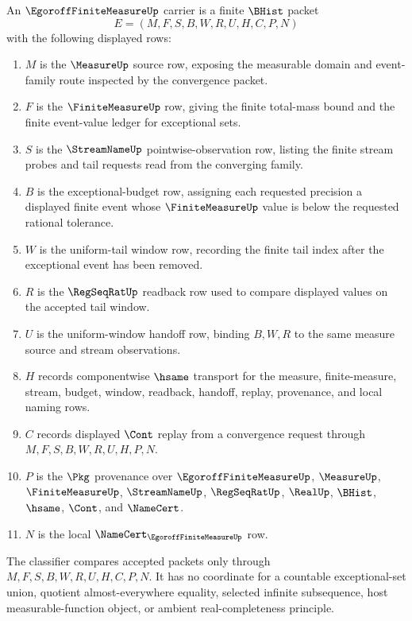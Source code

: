\begin{definition}
\label{def:egoroff-finite-measure-carrier}
An $\EgoroffFiniteMeasureUp$ carrier is a finite $\BHist$ packet
$$
E=(M,F,S,B,W,R,U,H,C,P,N)
$$
with the following displayed rows:
\begin{enumerate}
\item $M$ is the $\MeasureUp$ source row, exposing the measurable domain and event-family route inspected by the convergence packet.
\item $F$ is the $\FiniteMeasureUp$ row, giving the finite total-mass bound and the finite event-value ledger for exceptional sets.
\item $S$ is the $\StreamNameUp$ pointwise-observation row, listing the finite stream probes and tail requests read from the converging family.
\item $B$ is the exceptional-budget row, assigning each requested precision a displayed finite event whose $\FiniteMeasureUp$ value is below the requested rational tolerance.
\item $W$ is the uniform-tail window row, recording the finite tail index after the exceptional event has been removed.
\item $R$ is the $\RegSeqRatUp$ readback row used to compare displayed values on the accepted tail window.
\item $U$ is the uniform-window handoff row, binding $B,W,R$ to the same measure source and stream observations.
\item $H$ records componentwise $\hsame$ transport for the measure, finite-measure, stream, budget, window, readback, handoff, replay, provenance, and local naming rows.
\item $C$ records displayed $\Cont$ replay from a convergence request through $M,F,S,B,W,R,U,H,P,N$.
\item $P$ is the $\Pkg$ provenance over $\EgoroffFiniteMeasureUp$, $\MeasureUp$, $\FiniteMeasureUp$, $\StreamNameUp$, $\RegSeqRatUp$, $\RealUp$, $\BHist$, $\hsame$, $\Cont$, and $\NameCert$.
\item $N$ is the local $\NameCert_{\EgoroffFiniteMeasureUp}$ row.
\end{enumerate}
The classifier compares accepted packets only through $M,F,S,B,W,R,U,H,C,P,N$. It has no coordinate for a countable exceptional-set union, quotient almost-everywhere equality, selected infinite subsequence, host measurable-function object, or ambient real-completeness principle.
\end{definition}

